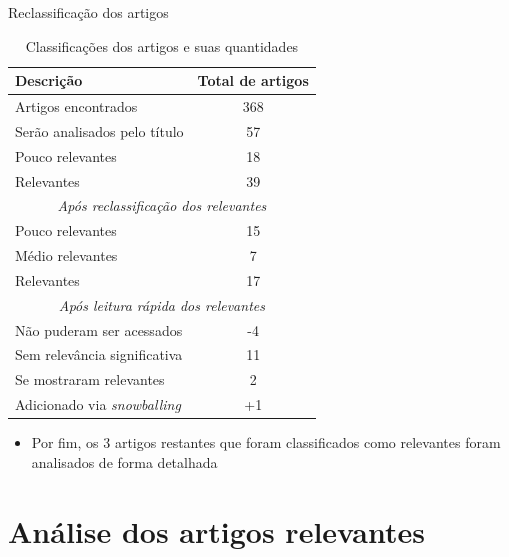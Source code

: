 \documentclass[brazilian]{beamer}
\begin{document}
\begin{frame}{Reclassificação dos artigos}
    \begin{table}[H]
        \centering
        \begin{tabular}{ l|c }
            Descrição & Total de artigos \\
            \hline
            Artigos encontrados & 368 \\
            \hline
            Serão analisados pelo título & 57 \\
            \hline
            Pouco relevantes & 18 \\
            Relevantes & 39 \\
            \hline
            \multicolumn{2}{c}{\textit{Após reclassificação dos relevantes}}\\
            \hline
            Pouco relevantes & 15 \\
            Médio relevantes & 7 \\
            Relevantes & 17 \\
            \hline
            \multicolumn{2}{c}{\textit{Após leitura rápida dos relevantes}}\\
            \hline
            Não puderam ser acessados & -4 \\
            Sem relevância significativa & 11 \\
            Se mostraram relevantes & 2 \\
            \hline
            Adicionado via \textit{snowballing} & +1 \\
        \end{tabular}
        \caption{Classificações dos artigos e suas quantidades}
        \label{table:reading_results}
    \end{table}
    \begin{itemize}
        \item Por fim, os 3 artigos restantes que foram classificados como relevantes foram analisados de forma detalhada
    \end{itemize}
\end{frame}

\section{Análise dos artigos relevantes}
\end{document}
